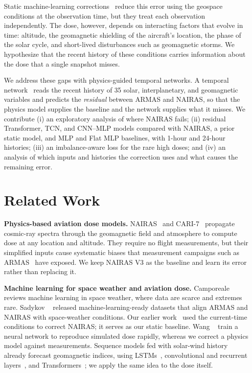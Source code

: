 \documentclass[10pt,twocolumn,letterpaper]{article}
\begin{document}
Static machine-learning corrections~\cite{kc2025} reduce this error using the
geospace conditions at the observation time, but they treat each observation
independently. The dose, however, depends on interacting factors that evolve
in time: altitude, the geomagnetic shielding of the aircraft's location, the
phase of the solar cycle, and short-lived disturbances such as geomagnetic
storms. We hypothesize that the recent history of these conditions carries
information about the dose that a single snapshot misses.

We address these gaps with physics-guided temporal networks. A temporal
network~\cite{vaswani2017,bai2018} reads the recent history of 35 solar,
interplanetary, and geomagnetic variables and predicts the \emph{residual}
between ARMAS and NAIRAS, so that the physics model supplies the baseline and
the network supplies what it misses. We contribute (i) an exploratory
analysis of where NAIRAS fails; (ii) residual Transformer, TCN, and CNN--MLP
models compared with NAIRAS, a prior static model, and MLP and Flat MLP
baselines, with 1-hour and 24-hour histories; (iii) an imbalance-aware loss
for the rare high doses; and (iv) an analysis of which inputs and histories
the correction uses and what causes the remaining error.

\section{Related Work}
\label{sec:related}

\textbf{Physics-based aviation dose models.}
NAIRAS~\cite{mertens2013} and CARI-7~\cite{copeland2017} propagate cosmic-ray
spectra through the geomagnetic field and atmosphere to compute dose at any
location and altitude. They require no flight measurements, but their
simplified inputs cause systematic biases that measurement campaigns such as
ARMAS~\cite{tobiska2016} have exposed. We keep NAIRAS V3 as the baseline and
learn its error rather than replacing it.

\textbf{Machine learning for space weather and aviation dose.}
Camporeale~\cite{camporeale2019} reviews machine learning in space weather,
where data are scarce and extremes rare. Sadykov
\etal~\cite{sadykov2026} released machine-learning-ready datasets that align
ARMAS and NAIRAS with space-weather conditions. Our earlier
work~\cite{kc2025} used the current-time conditions to correct NAIRAS; it
serves as our static baseline. Wang \etal~\cite{wang2024} train a neural
network to reproduce simulated dose rapidly, whereas we correct a physics model
against measurements. Sequence models fed with solar-wind history already
forecast geomagnetic indices, using LSTMs~\cite{gruet2018}, convolutional and
recurrent layers~\cite{collado2021}, and Transformers~\cite{abduallah2024}; we
apply the same idea to the dose itself.
\end{document}
